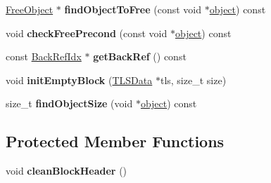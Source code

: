 \begin{DoxyCompactItemize}
\item 
\hypertarget{classrml_1_1internal_1_1Block_a8d135473283f12148804f1218a2a5b94}{}\hyperlink{structrml_1_1internal_1_1FreeObject}{Free\+Object} $\ast$ {\bfseries find\+Object\+To\+Free} (const void $\ast$\hyperlink{structobject}{object}) const \label{classrml_1_1internal_1_1Block_a8d135473283f12148804f1218a2a5b94}

\item 
\hypertarget{classrml_1_1internal_1_1Block_aab9502fc73e055fd7b1749073c94ef2b}{}void {\bfseries check\+Free\+Precond} (const void $\ast$\hyperlink{structobject}{object}) const \label{classrml_1_1internal_1_1Block_aab9502fc73e055fd7b1749073c94ef2b}

\item 
\hypertarget{classrml_1_1internal_1_1Block_ae9d405b69e5b8bad400ec23069f3ec1f}{}const \hyperlink{classrml_1_1internal_1_1BackRefIdx}{Back\+Ref\+Idx} $\ast$ {\bfseries get\+Back\+Ref} () const \label{classrml_1_1internal_1_1Block_ae9d405b69e5b8bad400ec23069f3ec1f}

\item 
\hypertarget{classrml_1_1internal_1_1Block_ac28a4338a88b594da0a1c4225e6c5d2e}{}void {\bfseries init\+Empty\+Block} (\hyperlink{classrml_1_1internal_1_1TLSData}{T\+L\+S\+Data} $\ast$tls, size\+\_\+t size)\label{classrml_1_1internal_1_1Block_ac28a4338a88b594da0a1c4225e6c5d2e}

\item 
\hypertarget{classrml_1_1internal_1_1Block_ac777e9d9032cab45acc9a6f328a22484}{}size\+\_\+t {\bfseries find\+Object\+Size} (void $\ast$\hyperlink{structobject}{object}) const \label{classrml_1_1internal_1_1Block_ac777e9d9032cab45acc9a6f328a22484}

\end{DoxyCompactItemize}
\subsection*{Protected Member Functions}
\begin{DoxyCompactItemize}
\item 
\hypertarget{classrml_1_1internal_1_1Block_a62edc0a79ebbbfff63671ad25b0561ba}{}void {\bfseries clean\+Block\+Header} ()\label{classrml_1_1internal_1_1Block_a62edc0a79ebbbfff63671ad25b0561ba}

\end{DoxyCompactItemize}
